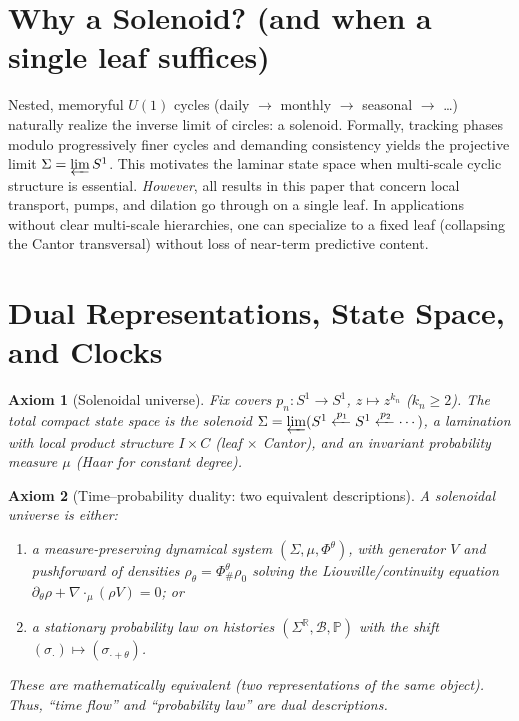 \documentclass[11pt]{article}
\newtheorem{axiom}{Axiom}
\newcommand{\R}{\mathbb{R}}
\begin{document}
\section*{Why a Solenoid? (and when a single leaf suffices)}
Nested, memoryful $U(1)$ cycles (daily $\to$ monthly $\to$ seasonal $\to$ \dots) naturally realize the inverse limit of circles: a solenoid. Formally, tracking phases modulo progressively finer cycles and demanding consistency yields the projective limit $\Sigma=\varprojlim S^1$. This motivates the laminar state space when multi-scale cyclic structure is essential. 
\emph{However}, all results in this paper that concern local transport, pumps, and dilation go through on a single leaf. In applications without clear multi-scale hierarchies, one can specialize to a fixed leaf (collapsing the Cantor transversal) without loss of near-term predictive content.


\section{Dual Representations, State Space, and Clocks}

\begin{axiom}[Solenoidal universe]
Fix covers $p_n:S^1\to S^1$, $z\mapsto z^{k_n}$ ($k_n\ge 2$). The total compact state space is the solenoid
$\Sigma=\varprojlim(S^1 \xleftarrow{p_1} S^1 \xleftarrow{p_2}\cdots)$,
a \emph{lamination} with local product structure $I\times C$ (leaf $\times$ Cantor), and an invariant probability measure $\mu$ (Haar for constant degree).
\end{axiom}

\begin{axiom}[Time--probability duality: two equivalent descriptions]\label{ax:duality}
A solenoidal universe is either:
\begin{enumerate}[label=(\alph*)]
\item a \emph{measure-preserving dynamical system} $(\Sigma,\mu,\Phi^\theta)$, with generator $V$ and pushforward of densities $\rho_\theta=\Phi^\theta_{\#}\rho_0$ solving the Liouville/continuity equation
$\partial_\theta \rho + \nabla\!\cdot_\mu(\rho V)=0$; or
\item a \emph{stationary probability law on histories} $(\Sigma^\R,\mathcal B,\mathbb P)$ with the \emph{shift} $(\sigma_\cdot)\mapsto(\sigma_{\cdot+\theta})$.
\end{enumerate}
These are mathematically equivalent (two representations of the same object). Thus, ``time flow'' and ``probability law'' are dual descriptions.
\end{axiom}
\end{document}
